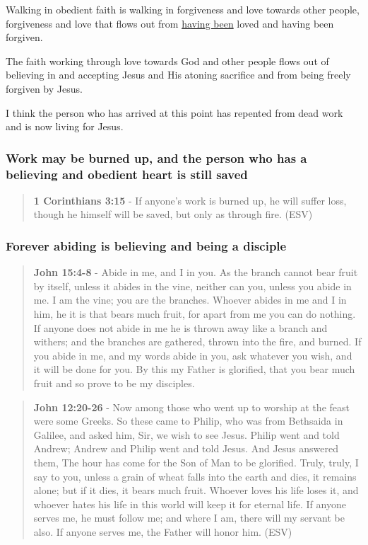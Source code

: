 \documentclass[11pt]{article}
\begin{document}
Walking in obedient faith is walking in forgiveness and love towards other people, forgiveness and love that flows out from \uline{having been} loved and having been forgiven.

The faith working through love towards God and other people flows out of believing in and accepting Jesus and His atoning sacrifice and from being freely forgiven by Jesus.

I think the person who has arrived at this point has repented from dead work and is now living for Jesus.

\subsubsection{Work may be burned up, and the person who has a believing and obedient heart is still saved}
\label{sec:org47a1efc}
\begin{quote}
\textbf{1 Corinthians 3:15} - If anyone's work is burned up, he will suffer loss, though he himself will be saved, but only as through fire. (ESV)
\end{quote}

\subsubsection{Forever abiding is believing and being a disciple}
\label{sec:orge3e7937}
\begin{quote}
\textbf{John 15:4-8} - Abide in me, and I in you. As the branch cannot bear fruit by itself, unless it abides in the vine, neither can you, unless you abide in me. I am the vine; you are the branches. Whoever abides in me and I in him, he it is that bears much fruit, for apart from me you can do nothing. If anyone does not abide in me he is thrown away like a branch and withers; and the branches are gathered, thrown into the fire, and burned. If you abide in me, and my words abide in you, ask whatever you wish, and it will be done for you. By this my Father is glorified, that you bear much fruit and so prove to be my disciples.
\end{quote}

\begin{quote}
\textbf{John 12:20-26} - Now among those who went up to worship at the feast were some Greeks. So these came to Philip, who was from Bethsaida in Galilee, and asked him, Sir, we wish to see Jesus. Philip went and told Andrew; Andrew and Philip went and told Jesus. And Jesus answered them, The hour has come for the Son of Man to be glorified. Truly, truly, I say to you, unless a grain of wheat falls into the earth and dies, it remains alone; but if it dies, it bears much fruit. Whoever loves his life loses it, and whoever hates his life in this world will keep it for eternal life. If anyone serves me, he must follow me; and where I am, there will my servant be also. If anyone serves me, the Father will honor him. (ESV)
\end{quote}
\end{document}
